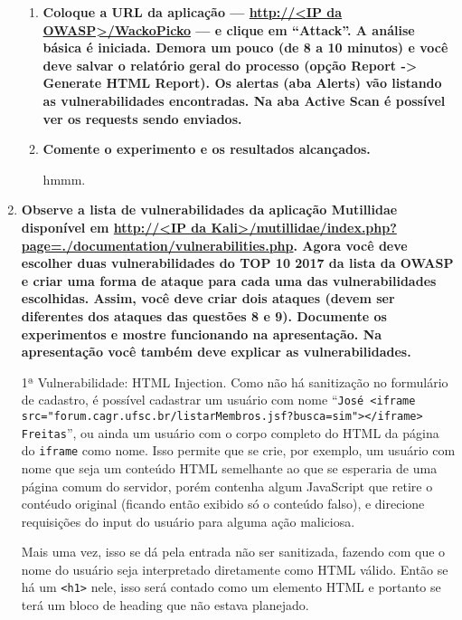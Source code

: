 \documentclass{article}
\newcommand{\code}[1]{\texttt{#1}}
\begin{document}
\begin{enumerate}
            \begin{enumerate}
                \item \textbf{Coloque a URL da aplicação --- \url{http://<IP da
                        OWASP>/WackoPicko} --- e clique em ``Attack''. A
                        análise básica é iniciada. Demora um pouco (de 8 a 10
                        minutos) e você deve salvar o relatório geral do
                        processo (opção Report -> Generate HTML Report). Os
                        alertas (aba Alerts) vão listando as vulnerabilidades
                        encontradas. Na aba Active Scan é possível ver os
                    requests sendo enviados.}

                \item \textbf{Comente o experimento e os resultados
                    alcançados.}

                    hmmm.
            \end{enumerate}
    \item \textbf{Observe a lista de vulnerabilidades da aplicação
        Mutillidae disponível em \url{http://<IP da
        Kali>/mutillidae/index.php?page=./documentation/vulnerabilities.php}.
        Agora você deve escolher duas vulnerabilidades do TOP 10 2017
        da lista da OWASP e criar uma forma de ataque para cada uma das
        vulnerabilidades escolhidas. Assim, você deve criar dois
        ataques (devem ser diferentes dos ataques das questões 8 e 9).
        Documente os experimentos e mostre funcionando na apresentação.
        Na apresentação você também deve explicar as vulnerabilidades.}

        1ª Vulnerabilidade: HTML Injection. Como não há sanitização no
        formulário de cadastro, é possível cadastrar um usuário com nome
        ``\code{José <iframe
        src="forum.cagr.ufsc.br/listarMembros.jsf?busca=sim"></iframe> Freitas}'',
        ou ainda um usuário com o corpo completo do HTML da página do
        \code{iframe} como nome.
        Isso permite que se crie, por exemplo, um usuário com nome que seja
        um conteúdo HTML semelhante ao que se esperaria de uma página comum
        do servidor, porém contenha algum JavaScript que retire o contéudo
        original (ficando então exibido só o conteúdo falso), e direcione
        requisições do input do usuário para alguma ação maliciosa.

        Mais uma vez, isso se dá pela entrada não ser sanitizada, fazendo
        com que o nome do usuário seja interpretado diretamente como HTML
        válido. Então se há um \code{<h1>} nele, isso será contado como um
        elemento HTML e portanto se terá um bloco de heading que não estava
        planejado.
    \end{enumerate}
\end{document}
